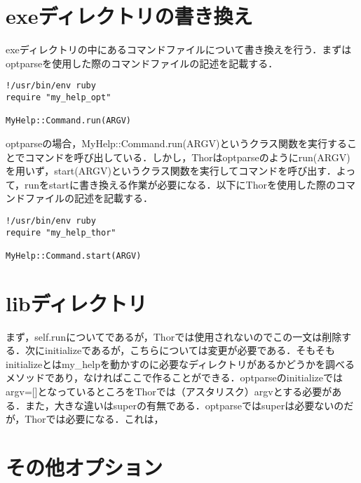 \section{exeディレクトリの書き換え}\label{exeux30c7ux30a3ux30ecux30afux30c8ux30eaux306eux66f8ux304dux63dbux3048}

exeディレクトリの中にあるコマンドファイルについて書き換えを行う．まずはoptparseを使用した際のコマンドファイルの記述を記載する．

\begin{screen}
{\small
\begin{verbatim}
!/usr/bin/env ruby                                                                                                               
require "my_help_opt"

MyHelp::Command.run(ARGV)
\end{verbatim}}
\end{screen}

optparseの場合，MyHelp::Command.run(ARGV)というクラス関数を実行することでコマンドを呼び出している．しかし，Thorはoptparseのようにrun(ARGV)を用いず，start(ARGV)というクラス関数を実行してコマンドを呼び出す．よって，runをstartに書き換える作業が必要になる．以下にThorを使用した際のコマンドファイルの記述を記載する．

\begin{screen}
{\small
\begin{verbatim}
!/usr/bin/env ruby                                                                                                               
require "my_help_thor"

MyHelp::Command.start(ARGV)
\end{verbatim}}
\end{screen}

\section{libディレクトリ}\label{libux30c7ux30a3ux30ecux30afux30c8ux30ea}

まず，self.runについてであるが，Thorでは使用されないのでこの一文は削除する．次にinitializeであるが，こちらについては変更が必要である．そもそもinitializeとはmy\_helpを動かすのに必要なディレクトリがあるかどうかを調べるメソッドであり，なければここで作ることができる．optparseのinitializeではargv={[}{]}となっているところをThorでは（アスタリスク）argvとする必要がある．また，大きな違いはsuperの有無である．optparseではsuperは必要ないのだが，Thorでは必要になる．これは，

\section{その他オプション}\label{ux305dux306eux4ed6ux30aaux30d7ux30b7ux30e7ux30f3}

